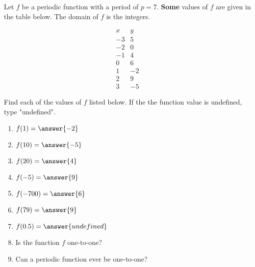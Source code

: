 \documentclass{ximera}
\author{Elizabeth Miller}
\begin{document}
Let $f$ be a periodic function with a period of $p=7$.  \textbf{Some} values of $f$ are given in the table below.  The domain of $f$ is the integers.  

$$
\begin{array}{cc}
x&y\\
\hline
-3&5\\
-2&0\\
-1&4\\
0&6\\
1&-2\\
2&9\\
3&-5
\end{array}
$$

\begin{exercise}
Find each of the values of $f$ listed below.  If the the function value is undefined, type "undefined".
\begin{enumerate}
\item $f(1) =\answer{-2}$
\item $f(10)=\answer{-5}$
\item$f(20)=\answer{4}$
\item$f(-5)=\answer{9}$
\item$f(-700)=\answer{6}$
\item$f(79)=\answer{9}$
\item$f(0.5)=\answer{undefined}$

\item Is the function $f$ one-to-one?
\begin{multipleChoice}
\end{multipleChoice}

\item Can a periodic function ever be one-to-one?
\begin{multipleChoice}
\end{multipleChoice}

\end{enumerate}
\end{exercise}
\end{document}
